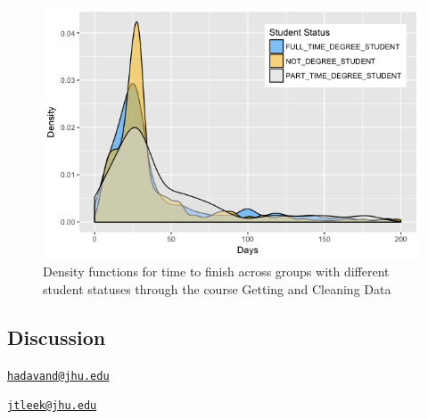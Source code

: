 \begin{figure}[htbp]
    \centering
    \includegraphics[scale=0.5]{stustatus}
    \caption{Density functions for time to finish across groups with different student statuses through the course Getting and Cleaning Data}
    \label{figure:stustatus}
\end{figure}

\subsection{Discussion}\label{discussion}



\address{%
Aboozar Hadavand\\
Bloomberg School of Public Health, Johns Hopkins University\\
615 N. Wolfe Street\\ Baltimore, MD 21205, USA\\
}
\href{mailto:hadavand@jhu.edu}{\nolinkurl{hadavand@jhu.edu}}

\address{%
Jeffrey Leek\\
Bloomberg School of Public Health, Johns Hopkins University\\
615 N. Wolfe Street\\ Baltimore, MD 21205, USA\\
}
\href{mailto:jtleek@jhu.edu}{\nolinkurl{jtleek@jhu.edu}}

